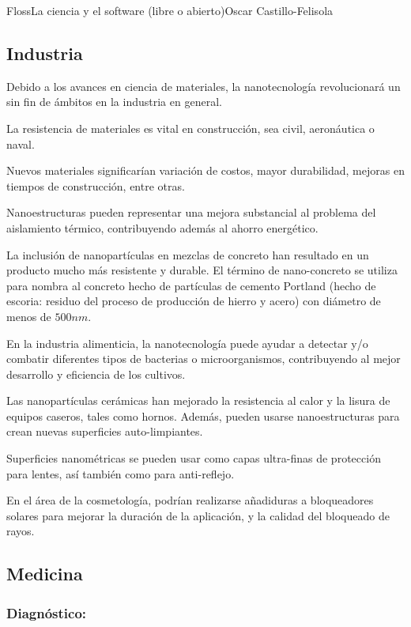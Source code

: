 \begin{article}[2]{Floss}{La ciencia y el software (libre o abierto)}{Oscar Castillo-Felisola}
\subsection{Industria}

Debido a los avances en ciencia de materiales, la nanotecnolog\'ia revolucionar\'a un sin fin de \'ambitos en la industria en general.

La resistencia de materiales es vital en construcci\'on, sea civil, aeron\'autica o naval. 

Nuevos materiales significar\'ian variaci\'on de costos, mayor durabilidad, mejoras en tiempos de construcci\'on, entre otras.

Nanoestructuras pueden representar una mejora substancial al problema del aislamiento t\'ermico, contribuyendo adem\'as al ahorro energ\'etico.

La inclusi\'on de nanopart\'iculas en mezclas de concreto han resultado en un producto mucho m\'as resistente y durable. El t\'ermino de nano-concreto se utiliza para nombra al concreto hecho de part\'iculas de cemento Portland (hecho de escoria: residuo del proceso de producci\'on de hierro y acero) con di\'ametro de menos de $500 n m$.


En la industria alimenticia, la nanotecnolog\'ia puede ayudar a detectar y/o combatir diferentes tipos de bacterias o microorganismos, contribuyendo al mejor desarrollo y eficiencia de los cultivos.

Las nanopart\'iculas cer\'amicas han mejorado la resistencia al calor y la lisura de equipos caseros, tales como hornos. Adem\'as, pueden usarse nanoestructuras para crean nuevas superficies auto-limpiantes.

Superficies nanom\'etricas se pueden usar como capas ultra-finas de protecci\'on para lentes, as\'i tambi\'en como para anti-reflejo.

En el \'area de la cosmetolog\'ia, podr\'ian realizarse a\~nadiduras a bloqueadores solares para mejorar la duraci\'on de la aplicaci\'on, y la calidad del bloqueado de rayos.

\subsection{Medicina}
\subsubsection*{Diagn\'ostico:}


\end{article}
